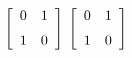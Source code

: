 {$\left[ \begin {array}{cc} 0&1\\\noalign{\medskip}1&0\end {array}
 \right] $
 }
{$\left[ \begin {array}{cc} 0&1\\\noalign{\medskip}1&0\end {array}
 \right] $}
